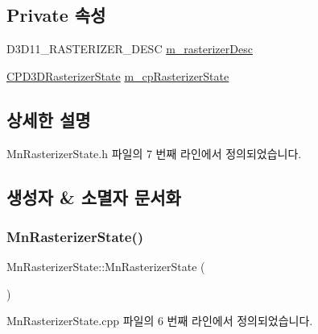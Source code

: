 \subsection*{Private 속성}
\begin{DoxyCompactItemize}
\item 
D3\+D11\+\_\+\+R\+A\+S\+T\+E\+R\+I\+Z\+E\+R\+\_\+\+D\+E\+SC \hyperlink{class_m_n_l_1_1_mn_rasterizer_state_a2eeef6c6d928646b13b441999a874ef5}{m\+\_\+rasterizer\+Desc}
\item 
\hyperlink{namespace_m_n_l_aa6c2682c64c5b58c458c36bb424f1e56}{C\+P\+D3\+D\+Rasterizer\+State} \hyperlink{class_m_n_l_1_1_mn_rasterizer_state_a185dd087f95f0e05f6c0cc03cf79b791}{m\+\_\+cp\+Rasterizer\+State}
\end{DoxyCompactItemize}


\subsection{상세한 설명}


Mn\+Rasterizer\+State.\+h 파일의 7 번째 라인에서 정의되었습니다.



\subsection{생성자 \& 소멸자 문서화}
\mbox{\label{class_m_n_l_1_1_mn_rasterizer_state_ac6a6dde00f1bba11b762c0ff21b9598c}} 
\subsubsection{\texorpdfstring{Mn\+Rasterizer\+State()}{MnRasterizerState()}}
{\footnotesize\ttfamily Mn\+Rasterizer\+State\+::\+Mn\+Rasterizer\+State (\begin{DoxyParamCaption}{ }\end{DoxyParamCaption})}



Mn\+Rasterizer\+State.\+cpp 파일의 6 번째 라인에서 정의되었습니다.

\mbox{\label{class_m_n_l_1_1_mn_rasterizer_state_a414bc5cdc7de69287821dd0ddd08ae52}} 
